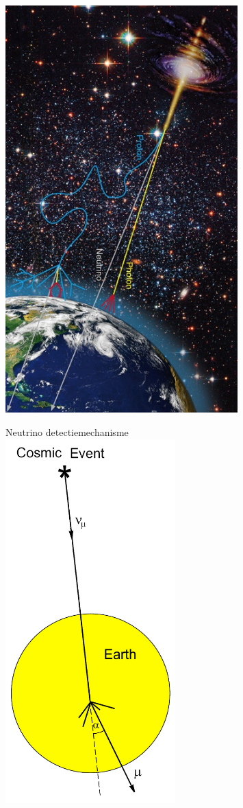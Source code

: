 \twocolumn
\begin{center}
\includegraphics[keepaspectratio,height=15.7cm]{app-vertical}
\end{center}

\newpage
\begin{center}
{\blue Neutrino detectiemechanisme}\\[5mm]
\includegraphics[keepaspectratio,height=14cm]{earth-shield}
\end{center}
